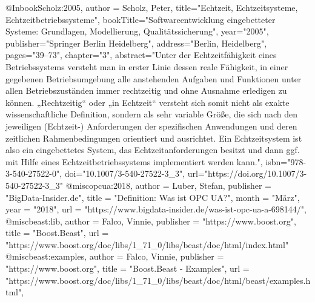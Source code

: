 @Inbook{Scholz:2005,
author = {Scholz, Peter},
title="Echtzeit, Echtzeitsysteme, Echtzeitbetriebssysteme",
bookTitle="Softwareentwicklung eingebetteter Systeme: Grundlagen, Modellierung, Qualit{\"a}tssicherung",
year="2005",
publisher="Springer Berlin Heidelberg",
address="Berlin, Heidelberg",
pages="39--73",
chapter="3",
abstract="Unter der Echtzeitf{\"a}higkeit eines Betriebssystems versteht man in erster Linie dessen reale F{\"a}higkeit, in einer gegebenen Betriebsumgebung alle anstehenden Aufgaben und Funktionen unter allen Betriebszust{\"a}nden immer rechtzeitig und ohne Ausnahme erledigen zu k{\"o}nnen. „Rechtzeitig`` oder „in Echtzeit`` versteht sich somit nicht als exakte wissenschaftliche Definition, sondern als sehr variable Gr{\"o}{\ss}e, die sich nach den jeweiligen (Echtzeit-) Anforderungen der spezifischen Anwendungen und deren zeitlichen Rahmenbedingungen orientiert und ausrichtet. Ein Echtzeitsystem ist also ein eingebettetes System, das Echtzeitanforderungen besitzt und dann ggf. mit Hilfe eines Echtzeitbetriebssystems implementiert werden kann.",
isbn="978-3-540-27522-0",
doi="10.1007/3-540-27522-3_3",
url="https://doi.org/10.1007/3-540-27522-3\_3"
}
@misc{opcua:2018,
  author = {Luber, Stefan},
  publisher = "BigData-Insider.de",
  title = "Definition: Was ist {OPC UA}?",
  month = "M{\"a}rz",
  year = "2018",
  url = "https://www.bigdata-insider.de/was-ist-opc-ua-a-698144/",
}
@misc{beast:lib,
  author = {Falco, Vinnie},
  publisher = "https://www.boost.org",
  title = "Boost.Beast",
  url = "https://www.boost.org/doc/libs/1\_71\_0/libs/beast/doc/html/index.html"
}
@misc{beast:examples,
  author = {Falco, Vinnie},
  publisher = "https://www.boost.org",
  title = "Boost.Beast - Examples",
  url = "https://www.boost.org/doc/libs/1\_71\_0/libs/beast/doc/html/beast/examples.html",
}